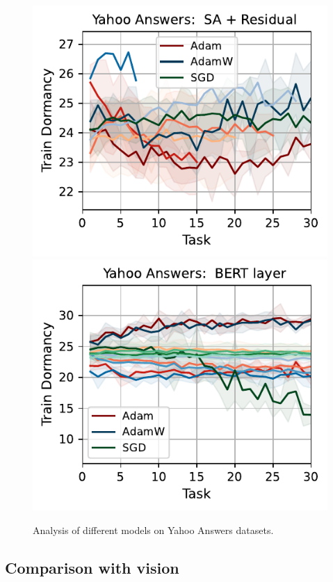 \begin{figure}[htb!]
{    \includegraphics[width=\textwidth]{figs/Dormancy/nlp/attention_residual/yahoo_answers_40.pdf}
    \includegraphics[width=\textwidth]{figs/Dormancy/nlp/bert_layer/yahoo_answers_40.pdf}
    }
    \caption{Analysis of different models on Yahoo Answers datasets.}
    \label{fig:yahoo_models_analysis}
\end{figure}



\subsection{Comparison with vision}

